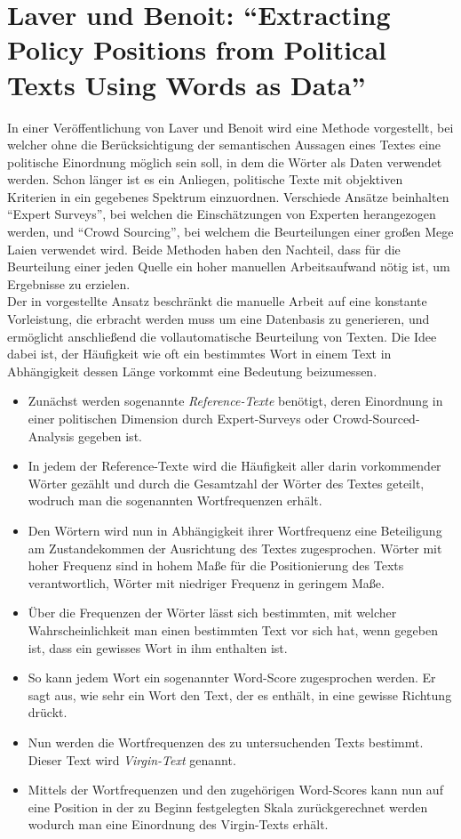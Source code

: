 
\section{Laver und Benoit: \enquote{Extracting Policy Positions from Political Texts Using Words as Data}  }
In einer Veröffentlichung von Laver und Benoit \cite{LuB} wird eine Methode vorgestellt, bei welcher ohne die Berücksichtigung der semantischen Aussagen eines Textes eine politische Einordnung möglich sein soll, in dem die Wörter als Daten verwendet werden. 
Schon länger ist es ein Anliegen, politische Texte mit objektiven Kriterien in ein gegebenes Spektrum einzuordnen. Verschiede Ansätze beinhalten \enquote{Expert Surveys}, bei welchen die Einschätzungen von Experten herangezogen werden, und \enquote{Crowd Sourcing}, bei welchem die Beurteilungen einer großen Mege Laien verwendet wird. Beide Methoden haben den Nachteil, dass für die Beurteilung einer jeden Quelle ein hoher manuellen Arbeitsaufwand nötig ist, um Ergebnisse zu erzielen. \\
Der in  \cite{LuB} vorgestellte Ansatz beschränkt die manuelle Arbeit auf eine konstante Vorleistung, die erbracht werden muss um eine Datenbasis zu generieren, und ermöglicht anschließend die vollautomatische Beurteilung von Texten. Die Idee dabei ist, der Häufigkeit wie oft ein bestimmtes Wort in einem Text in Abhängigkeit dessen Länge vorkommt eine Bedeutung beizumessen. 
\begin{itemize}
\item Zunächst werden sogenannte \emph{Reference-Texte} benötigt, deren Einordnung in einer politischen Dimension durch Expert-Surveys oder Crowd-Sourced-Analysis gegeben ist.
\item In jedem der Reference-Texte wird die Häufigkeit aller darin vorkommender Wörter gezählt und durch die Gesamtzahl der Wörter des Textes geteilt, wodruch man die sogenannten Wortfrequenzen erhält.
\item Den Wörtern wird nun in Abhängigkeit ihrer Wortfrequenz eine Beteiligung am Zustandekommen der Ausrichtung des Textes zugesprochen. Wörter mit hoher Frequenz sind in hohem Maße für die Positionierung des Texts verantwortlich, Wörter mit niedriger Frequenz in geringem Maße.
\item Über die Frequenzen der Wörter lässt sich bestimmten, mit welcher Wahrscheinlichkeit man einen bestimmten Text vor sich hat, wenn gegeben ist, dass ein gewisses Wort in ihm enthalten ist.
\item So kann jedem Wort ein sogenannter Word-Score zugesprochen werden. Er sagt aus, wie sehr ein Wort den Text, der es enthält, in eine gewisse Richtung drückt.
\item Nun werden die Wortfrequenzen des zu untersuchenden Texts bestimmt. Dieser Text wird \emph{Virgin-Text} genannt.
\item Mittels der Wortfrequenzen und den zugehörigen Word-Scores kann nun auf eine Position in der zu Beginn festgelegten Skala zurückgerechnet werden wodurch man eine Einordnung des Virgin-Texts erhält.  
\end{itemize}

